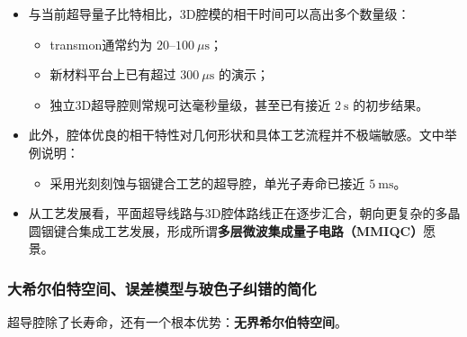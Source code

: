 \documentclass[12pt,a4paper,oneside]{ctexbook}
\begin{document}
\begin{itemize}
    \item 与当前超导量子比特相比，3D腔模的相干时间可以高出多个数量级：
    \begin{itemize}
        \item transmon通常约为 \(20\text{--}100~\mu\mathrm{s}\)；
        \item 新材料平台上已有超过 \(300~\mu\mathrm{s}\) 的演示；
        \item 独立3D超导腔则常规可达毫秒量级，甚至已有接近 \(2~\mathrm{s}\) 的初步结果。
    \end{itemize}
    
    \item 此外，腔体优良的相干特性对几何形状和具体工艺流程并不极端敏感。文中举例说明：
    \begin{itemize}
        \item 采用光刻刻蚀与铟键合工艺的超导腔，单光子寿命已接近 \(5~\mathrm{ms}\)。
    \end{itemize}
    
    \item 从工艺发展看，平面超导线路与3D腔体路线正在逐步汇合，朝向更复杂的多晶圆铟键合集成工艺发展，形成所谓\textbf{多层微波集成量子电路（MMIQC）}愿景。
\end{itemize}

\subsubsection{大希尔伯特空间、误差模型与玻色子纠错的简化}

超导腔除了长寿命，还有一个根本优势：\textbf{无界希尔伯特空间}。
\end{document}
